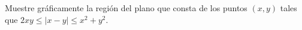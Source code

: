\item Muestre gráficamente la región del plano que consta de los puntos $(x, y)$ tales que $2xy \le |x - y| \le x^2 + y^2$.
